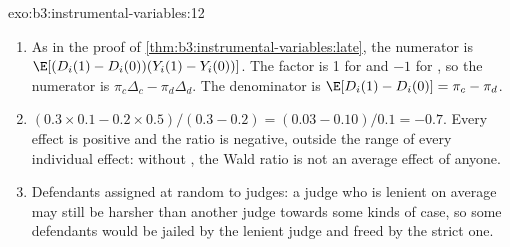 \begin{solution}{exo:b3:instrumental-variables:12}
\begin{enumerate}
\item As in the proof of \cref{thm:b3:instrumental-variables:late}, the
numerator is $\E[(D_i(1) - D_i(0))(Y_i(1) - Y_i(0))]$. The factor is 1 for
 and $-1$ for , so the numerator is $\pi_c\Delta_c -
\pi_d\Delta_d$. The denominator is $\E[D_i(1) - D_i(0)] = \pi_c - \pi_d$.
\item $(0.3 \times 0.1 - 0.2 \times 0.5)/(0.3 - 0.2) = (0.03 - 0.10)/0.1 =
-0.7$. Every effect is positive and the ratio is negative, outside the range of
every individual effect: without , the Wald ratio is not an
average effect of anyone.
\item Defendants assigned at random to judges: a judge who is lenient on
average may still be harsher than another judge towards some kinds of case, so
some defendants would be jailed by the lenient judge and freed by the strict
one.
\end{enumerate}
\end{solution}

